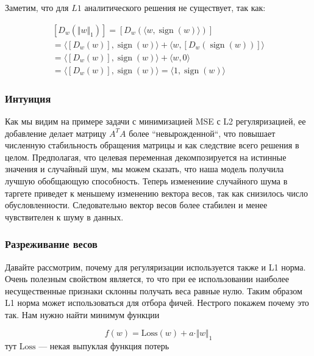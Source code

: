\documentclass{article}
\begin{document}
    Заметим, что для $L1$ аналитического решения не существует, так как: 

    \[
    \begin{gathered}
        [D_{w}(\Vert w \Vert_{1})] = [D_{w}(\langle w, \operatorname{sign}(w) \rangle)] \\ 
        = \langle [D_{w}(w)], \operatorname{sign}(w) \rangle + \langle w, [D_{w}(\operatorname{sign}(w) )]\rangle \\ 
        = \langle [D_{w}(w)], \operatorname{sign}(w) \rangle + \langle w, 0 \rangle \\ 
        = \langle [D_{w}(w)], \operatorname{sign}(w) \rangle = \langle 1, \operatorname{sign}(w) \rangle
    \end{gathered}
    \]

    \subsubsection{Интуиция}

    Как мы видим на примере задачи с минимизацией MSE с L2 регуляризацией, ее добавление делает 
    матрицу $A^{T} A$ более ``невырожденной``, что повышает численную стабильность обращения матрицы и как 
    следствие всего решения в целом. Предполагая, что целевая переменная
    декомпозируется на истинные значения и случайный 
    шум, мы можем сказать, что наша модель получила лучшую обобщающую способность. Теперь изменениие
    случайного шума в таргете приведет к меньшему изменению вектора весов, так как снизилось число обусловленности.
    Следовательно вектор весов более стабилен и менее чувствителен к шуму в данных. 

    \subsubsection{Разреживание весов}

    Давайте рассмотрим, почему для регуляризации используется также и L1 норма. Очень полезным свойством является, то 
    что при ее использовании наиболее несущественные признаки склонны получать веса равные нулю. Таким образом L1 норма может использоваться для отбора фичей.
    Нестрого покажем почему это так. Нам нужно найти минимум функции 

    \begin{equation}
        f(w) = \text{Loss}(w) + a \cdot \Vert w \Vert_{1}
    \end{equation}
    тут $\text{Loss}$ --- некая выпуклая функция потерь 
\end{document}
